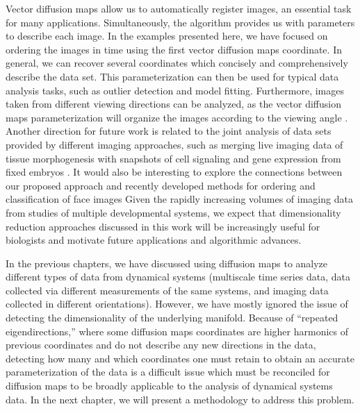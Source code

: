 Vector diffusion maps allow us to automatically register images, an essential task for many applications.
%
Simultaneously, the algorithm provides us with parameters to describe each image.
%
In the examples presented here, we have focused on ordering the images in time using the first vector diffusion maps coordinate.
%
In general, we can recover several coordinates which concisely and comprehensively describe the data set.
%
This parameterization can then be used for typical data analysis tasks, such as outlier detection and model fitting.
%
Furthermore, images taken from different viewing directions can be analyzed, as the vector diffusion maps parameterization will organize the images according to the viewing angle \citep{singer2011viewing}.
%
Another direction for future work is related to the joint analysis of data sets provided by different imaging approaches, such as merging live imaging data of tissue morphogenesis with snapshots of cell signaling and gene expression from fixed embryos \citep{krzic2012multiview, ichikawa2014live, rubel2010coupling, dsilva2013nonlinear}.
%
It would also be interesting to explore the connections between our proposed approach and recently developed methods for ordering and classification of face images \citep{kemelmacher2011exploring, kemelmacher2014illumination}
%
Given the rapidly increasing volumes of imaging data from studies of multiple developmental systems, we expect that dimensionality reduction approaches discussed in this work will be increasingly useful for biologists and motivate future applications and algorithmic advances.

In the previous chapters, we have discussed using diffusion maps to analyze different types of data from dynamical systems (multiscale time series data, data collected via different measurements of the same systems, and imaging data collected in different orientations).
%
However, we have mostly ignored the issue of detecting the dimensionality of the underlying manifold.
%
Because of ``repeated eigendirections,'' where some diffusion maps coordinates are higher harmonics of previous coordinates and do not describe any new directions in the data, detecting how many and which coordinates one must retain to obtain an accurate parameterization of the data is a difficult issue which must be reconciled for diffusion maps to be broadly applicable to the analysis of dynamical systems data.
%
In the next chapter, we will present a methodology to address this problem. 
